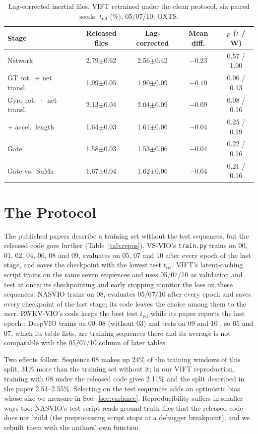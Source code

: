 \documentclass[letterpaper,journal]{IEEEtran}
\newcommand{\trel}{t_{\mathrm{rel}}}
\begin{document}
\begin{table}[t]
\centering
\caption{Lag-corrected inertial files, VIFT retrained under the clean protocol, six paired seeds. $\trel$ (\%), 05/07/10, OXTS.}
\label{tab:e4}
\setlength{\tabcolsep}{1.8pt}
\begin{tabular}{@{}lcccc@{}}
\toprule
Stage & Released files & Lag-corrected & Mean diff. & $p$ ($t$ / W) \\
\midrule
Network & 2.79$\pm$0.62 & 2.56$\pm$0.42 & $-0.23$ & 0.57 / 1.00 \\
GT rot.\ + net transl. & 1.99$\pm$0.05 & 1.90$\pm$0.09 & $-0.10$ & 0.06 / 0.13 \\
Gyro rot.\ + net transl. & 2.13$\pm$0.04 & 2.04$\pm$0.09 & $-0.09$ & 0.08 / 0.16 \\
+ accel.\ length & 1.64$\pm$0.03 & 1.61$\pm$0.06 & $-0.04$ & 0.25 / 0.19 \\
Gate \cite{ElMadah2026gate} & 1.58$\pm$0.03 & 1.53$\pm$0.06 & $-0.04$ & 0.22 / 0.16 \\
Gate vs.\ SuMa & 1.67$\pm$0.04 & 1.62$\pm$0.06 & $-0.04$ & 0.21 / 0.16 \\
\bottomrule
\end{tabular}
\end{table}

\section{The Protocol}
\label{sec:protocol}

The published papers describe a training set without the test sequences, but the released code goes further (Table~\ref{tab:repos}). VS-VIO's \texttt{train.py} trains on 00, 01, 02, 04, 06, 08 and 09, evaluates on 05, 07 and 10 after every epoch of the last stage, and saves the checkpoint with the lowest test $\trel$. VIFT's latent-caching script trains on the same seven sequences and uses 05/07/10 as validation and test at once; its checkpointing and early stopping monitor the loss on these sequences. NASVIO trains on 08, evaluates 05/07/10 after every epoch and saves every checkpoint of the last stage; its code leaves the choice among them to the user. RWKV-VIO's code keeps the best test $\trel$ while its paper reports the last epoch \cite{RWKVVIO2025}; DeepVIO trains on 00--08 (without 03) and tests on 09 and 10 \cite{Han2019}, so 05 and 07, which its table lists, are training sequences there and its average is not comparable with the 05/07/10 column of later tables.

Two effects follow. Sequence 08 makes up 24\% of the training windows of this split, 31\% more than the training set without it; in our VIFT reproduction, training with 08 under the released code gives 2.11\% and the split described in the paper 2.54--2.55\%. Selecting on the test sequences adds an optimistic bias whose size we measure in Sec.~\ref{sec:variance}. Reproducibility suffers in smaller ways too: NASVIO's test script reads ground-truth files that the released code does not build (the preprocessing script stops at a debugger breakpoint), and we rebuilt them with the authors' own function.
\end{document}
